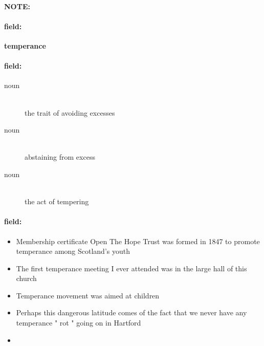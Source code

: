 \documentclass[12pt]{article}
\newenvironment{note}{\paragraph{NOTE:}}{}
\newenvironment{field}{\paragraph{field:}}{}
\begin{document}
\begin{note}
\begin{field}
\textbf{\large temperance}
\end{field}


\begin{field}
\begin{description}
\item[noun] \hfill \\ 
the trait of avoiding excesses

\item[noun] \hfill \\ 
abstaining from excess

\item[noun] \hfill \\ 
the act of tempering

\end{description}
\end{field}

\begin{field}
\begin{itemize}
\item Membership certificate Open The Hope Trust was formed in 1847 to promote temperance among Scotland's youth
\item The first temperance meeting I ever attended was in the large hall of this church
\item Temperance movement was aimed at children
\item Perhaps this dangerous latitude comes of the fact that we never have any temperance " rot " going on in Hartford
\item 
\end{itemize}
\end{field}
\end{note}
\end{document}
